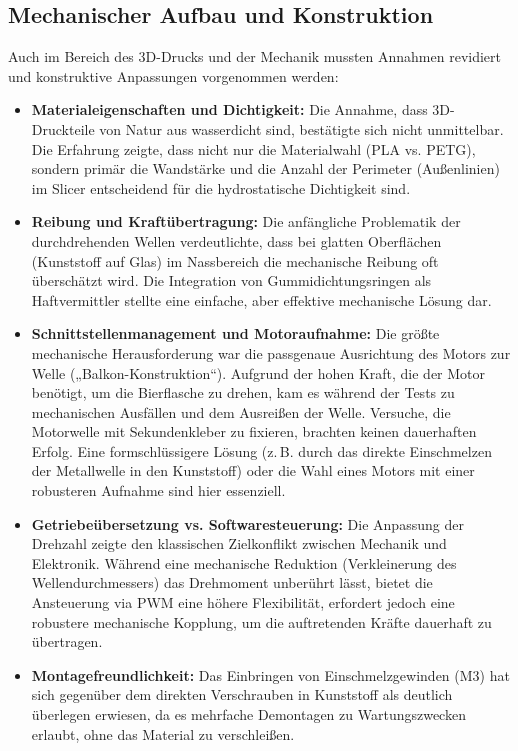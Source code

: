\subsection{Mechanischer Aufbau und Konstruktion}
Auch im Bereich des 3D-Drucks und der Mechanik mussten Annahmen revidiert und konstruktive Anpassungen vorgenommen werden:
\begin{itemize}
	\item \textbf{Materialeigenschaften und Dichtigkeit:} Die Annahme, dass 3D-Druckteile von Natur aus wasserdicht sind, bestätigte sich nicht unmittelbar. Die Erfahrung zeigte, dass nicht nur die Materialwahl (PLA vs. PETG), sondern primär die Wandstärke und die Anzahl der Perimeter (Außenlinien) im Slicer entscheidend für die hydrostatische Dichtigkeit sind.
	\item \textbf{Reibung und Kraftübertragung:} Die anfängliche Problematik der durchdrehenden Wellen verdeutlichte, dass bei glatten Oberflächen (Kunststoff auf Glas) im Nassbereich die mechanische Reibung oft überschätzt wird. Die Integration von Gummidichtungsringen als Haftvermittler stellte eine einfache, aber effektive mechanische Lösung dar.
	\item \textbf{Schnittstellenmanagement und Motoraufnahme:} Die größte mechanische Herausforderung war die passgenaue Ausrichtung des Motors zur Welle („Balkon-Konstruktion“). Aufgrund der hohen Kraft, die der Motor benötigt, um die Bierflasche zu drehen, kam es während der Tests zu mechanischen Ausfällen und dem Ausreißen der Welle. Versuche, die Motorwelle mit Sekundenkleber zu fixieren, brachten keinen dauerhaften Erfolg. Eine formschlüssigere Lösung (z.\,B. durch das direkte Einschmelzen der Metallwelle in den Kunststoff) oder die Wahl eines Motors mit einer robusteren Aufnahme sind hier essenziell.
	\item \textbf{Getriebeübersetzung vs. Softwaresteuerung:} Die Anpassung der Drehzahl zeigte den klassischen Zielkonflikt zwischen Mechanik und Elektronik. Während eine mechanische Reduktion (Verkleinerung des Wellendurchmessers) das Drehmoment unberührt lässt, bietet die Ansteuerung via PWM eine höhere Flexibilität, erfordert jedoch eine robustere mechanische Kopplung, um die auftretenden Kräfte dauerhaft zu übertragen.
	\item \textbf{Montagefreundlichkeit:} Das Einbringen von Einschmelzgewinden (M3) hat sich gegenüber dem direkten Verschrauben in Kunststoff als deutlich überlegen erwiesen, da es mehrfache Demontagen zu Wartungszwecken erlaubt, ohne das Material zu verschleißen.
\end{itemize}

